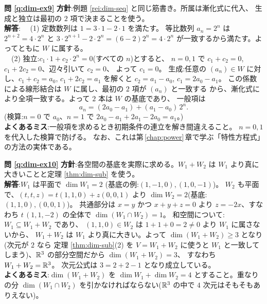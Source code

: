 \bigskip
\noindent\textbf{問 \ref{q:dim-ex9}}\quad
\textbf{方針}:例題 \ref{rei:dim-seq} と同じ筋書き。所属は漸化式に代入、
生成と独立は最初の $2$ 項で決まることを使う。\\
\textbf{解答}:
　(1) 定数数列は $1 = 3 \cdot 1 - 2 \cdot 1$ を満たす。
等比数列 $a_n = 2^n$ は
$2^{n+2} = 4 \cdot 2^n$ と $3 \cdot 2^{n+1} - 2 \cdot 2^n
= (6 - 2)2^n = 4 \cdot 2^n$ が一致するから満たす。よってともに $W$ に属する。\\
　(2) 独立:$c_1 \cdot 1 + c_2 \cdot 2^n = 0$(すべての $n$)とすると、
$n = 0, 1$ で $c_1 + c_2 = 0$, $c_1 + 2c_2 = 0$、辺々引いて $c_2 = 0$、
よって $c_1 = 0$。
生成:任意の $(a_n) \in W$ に対し、$c_1 + c_2 = a_0$,
$c_1 + 2c_2 = a_1$ を解くと $c_2 = a_1 - a_0$, $c_1 = 2a_0 - a_1$。
この係数による線形結合は $W$ に属し、最初の $2$ 項が $(a_n)$ と一致する
から、漸化式により全項一致する。よって $2$ 本は $W$ の基底であり、
一般項は
\[
a_n = (2a_0 - a_1) + (a_1 - a_0)\,2^n.
\]
(検算:$n = 0$ で $a_0$、$n = 1$ で $2a_0 - a_1 + 2a_1 - 2a_0 = a_1$。)\\
\textbf{よくあるミス}:一般項を求めるとき初期条件の連立を解き間違えること。
$n = 0, 1$ を代入した検算で防げる。
なお、これは第\,\ref{chap:power}\,章で学ぶ「特性方程式」の方法の実体である。

\bigskip
\noindent\textbf{問 \ref{q:dim-ex10}}\quad
\textbf{方針}:各空間の基底を実際に求める。$W_1 + W_2$ は
$W_1$ より真に大きいことと定理 \ref{thm:dim-sub} を使う。\\
\textbf{解答}:$W_1$ は平面で $\dim W_1 = 2$
(基底の例:$(1, -1, 0), (1, 0, -1)$)。
$W_2$ も平面で、$(t, t, z) = t(1, 1, 0) + z(0, 0, 1)$ より
$\dim W_2 = 2$(基底:$(1,1,0), (0,0,1)$)。
共通部分は $x = y$ かつ $x + y + z = 0$ より $z = -2x$、すなわち
$t\,(1, 1, -2)$ の全体で $\dim(W_1 \cap W_2) = 1$。
和空間について:$W_1 \subseteq W_1 + W_2$ であり、
$(1, 1, 0) \in W_2$ は $1 + 1 + 0 = 2 \neq 0$ より $W_1$ に属さないから、
$W_1 + W_2$ は $W_1$ より真に大きい。よって
$\dim(W_1 + W_2) \ge 3$ となり(次元が $2$ なら
定理 \ref{thm:dim-sub}(2) を $V = W_1 + W_2$ に使うと $W_1$ と一致して
しまう)、$\mathbb{R}^3$ の部分空間だから $\dim(W_1 + W_2) = 3$、
すなわち $W_1 + W_2 = \mathbb{R}^3$。
次元公式は $3 = 2 + 2 - 1$ となり成立している。\\
\textbf{よくあるミス}:$\dim(W_1 + W_2)$ を
$\dim W_1 + \dim W_2 = 4$ とすること。重なりの分
$\dim(W_1 \cap W_2)$ を引かなければならない($\mathbb{R}^3$ の中で
$4$ 次元はそもそもありえない)。

